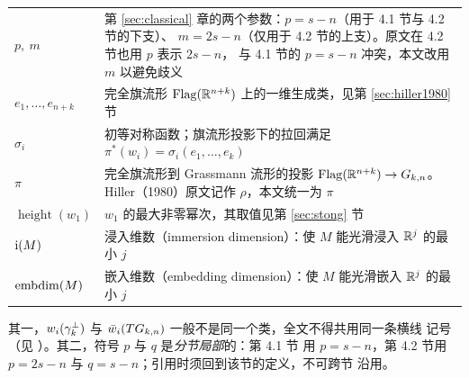 \begin{center}
\begin{tabularx}{\textwidth}{@{}>{\raggedright\arraybackslash}p{4.3cm}
    >{\raggedright\arraybackslash}X@{}}
\addlinespace[1pt]
$p,\ m$ &
第 \ref{sec:classical} 章的两个参数：$p=s-n$（用于 4.1 节与 4.2 节的下支）、
$m=2s-n$（仅用于 4.2 节的上支）。原文在 4.2 节也用 $p$ 表示 $2s-n$，
与 4.1 节的 $p=s-n$ 冲突，本文改用 $m$ 以避免歧义 \\
\addlinespace[1pt]
$e_1,\dots,e_{n+k}$ &
完全旗流形 $\operatorname{Flag}(\mathbb{R}^{n+k})$ 上的一维生成类，见第 \ref{sec:hiller1980} 节 \\
\addlinespace[1pt]
$\sigma_i$ &
初等对称函数；旗流形投影下的拉回满足
$\pi^{*}(w_i)=\sigma_i(e_1,\dots,e_k)$ \\
\addlinespace[1pt]
$\pi$ &
完全旗流形到 Grassmann 流形的投影
$\operatorname{Flag}(\mathbb{R}^{n+k})\to G_{k,n}$。Hiller（1980）原文记作 $\rho$，本文统一为 $\pi$ \\
\addlinespace[1pt]
$\operatorname{height}(w_1)$ &
$w_1$ 的最大非零幂次，其取值见第 \ref{sec:stong} 节 \\
\addlinespace[1pt]
$\operatorname{i}(M)$ &
浸入维数（immersion dimension）：使 $M$ 能光滑浸入 $\mathbb{R}^{j}$ 的最小 $j$ \\
\addlinespace[1pt]
$\operatorname{embdim}(M)$ &
嵌入维数（embedding dimension）：使 $M$ 能光滑嵌入 $\mathbb{R}^{j}$ 的最小 $j$ \\
\bottomrule
\end{tabularx}
\end{center}

\begin{remark*}[记号上的两处提醒]
其一，$w_i(\gamma^{\perp}_k)$ 与 $\bar w_i(TG_{k,n})$ 一般不是同一个类，全文不得共用同一条横线
记号（见 ）。其二，符号 $p$ 与 $q$ 是\emph{分节局部}的：第 4.1 节
用 $p=s-n$，第 4.2 节用 $p=2s-n$ 与 $q=s-n$；引用时须回到该节的定义，不可跨节
沿用。
\end{remark*}
